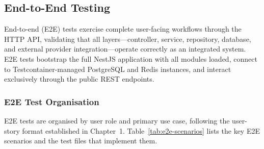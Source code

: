 
\subsection{End-to-End Testing}
\label{sec:e2e-testing}

End-to-end (E2E) tests exercise complete user-facing workflows through the HTTP API, validating that all layers---controller, service, repository, database, and external provider integration---operate correctly as an integrated system. E2E tests bootstrap the full NestJS application with all modules loaded, connect to Testcontainer-managed PostgreSQL and Redis instances, and interact exclusively through the public REST endpoints.

\subsubsection{E2E Test Organisation}

E2E tests are organised by user role and primary use case, following the user-story format established in Chapter~1. Table~\ref{tab:e2e-scenarios} lists the key E2E scenarios and the test files that implement them.

